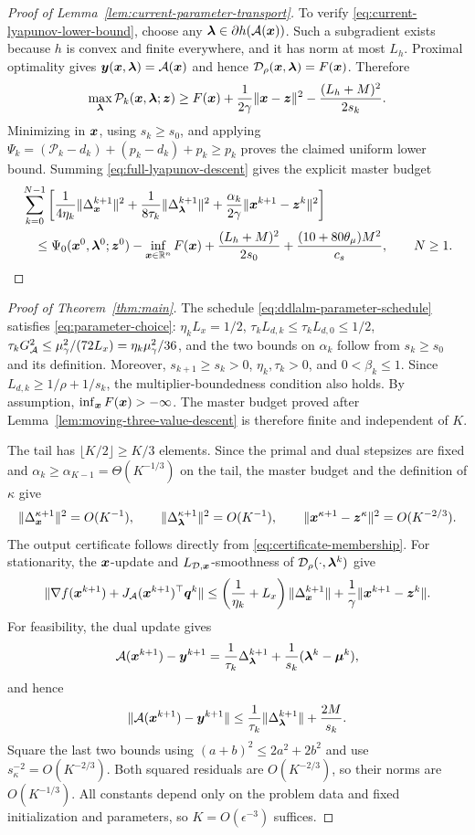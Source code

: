 \begin{proof}[Proof of Lemma~\ref{lem:current-parameter-transport}]
To verify \eqref{eq:current-lyapunov-lower-bound}, choose any
$\bm{\lambda}\in\partial h(\mathcal{A}(\bm{x}))$. Such a subgradient exists because
$h$ is convex and finite everywhere, and it has norm at most $L_h$.
Proximal optimality gives $\bm{y}(\bm{x},\bm{\lambda})=\mathcal{A}(\bm{x})$ and hence
$\mathcal D_\rho(\bm{x},\bm{\lambda})=F(\bm{x})$. Therefore
\[
\max_{\bm{\lambda}}\mathcal P_k(\bm{x},\bm{\lambda};\bm{z})
\ge F(\bm{x})+\frac1{2\gamma}\|\bm{x}-\bm{z}\|^2
-\frac{(L_h+M)^2}{2s_k}.
\]
Minimizing in $\bm{x}$, using $s_k\ge s_0$, and applying
$\Psi_k=(\mathcal P_k-d_k)+(p_k-d_k)+p_k\ge p_k$
proves the claimed uniform lower bound. Summing
\eqref{eq:full-lyapunov-descent} gives the explicit master budget
\[
\begin{aligned}
&\sum_{k=0}^{N-1}\left[
\frac1{4\eta_k}\|\Delta_{\bm{x}}^{k+1}\|^2
+\frac1{8\tau_k}\|\Delta_{\bm{\lambda}}^{k+1}\|^2
+\frac{\alpha_k}{2\gamma}\|\bm{x}^{k+1}-\bm{z}^k\|^2\right] \\
&\quad\le
\Psi_0(\bm{x}^0,\bm{\lambda}^0;\bm{z}^0)-\inf_{\bm{x}\in\mathbb{R}^n}F(\bm{x})
+\frac{(L_h+M)^2}{2s_0}
+\frac{(10+80\theta_\mu)M^2}{c_s},
\qquad N\ge1.
\end{aligned}
\]
\end{proof}
\fi


\begin{proof}[Proof of Theorem~\ref{thm:main}]
The schedule \eqref{eq:ddlalm-parameter-schedule} satisfies
\eqref{eq:parameter-choice}: $\eta_kL_x=1/2$,
$\tau_kL_{d,k}\le\tau_kL_{d,0}\le1/2$,
$\tau_kG_{\cal A}^2\le\mu_\gamma^2/(72L_x)
=\eta_k\mu_\gamma^2/36$, and the two bounds on $\alpha_k$ follow
from $s_k\ge s_0$ and its definition. Moreover,
$s_{k+1}\ge s_k>0$, $\eta_k,\tau_k>0$, and
$0<\beta_k\le1$. Since $L_{d,k}\ge1/\rho+1/s_k$,
the multiplier-boundedness condition also holds.
By assumption, $\inf_{\bm{x}}F(\bm{x})>-\infty$. The master budget proved after
Lemma~\ref{lem:moving-three-value-descent} is therefore finite and
independent of $K$.

The tail has $\lfloor K/2\rfloor\ge K/3$ elements. Since the primal
and dual stepsizes are fixed and
$\alpha_k\ge\alpha_{K-1}=\Theta(K^{-1/3})$ on the tail, the master
budget and the definition of $\kappa$ give
\[
\|\Delta_{\bm{x}}^{\kappa+1}\|^2=O(K^{-1}),\qquad
\|\Delta_{\bm{\lambda}}^{\kappa+1}\|^2=O(K^{-1}),\qquad
\|\bm{x}^{\kappa+1}-\bm{z}^\kappa\|^2=O(K^{-2/3}).
\]
The output certificate follows directly from
\eqref{eq:certificate-membership}. For stationarity, the $\bm{x}$-update
and $L_{\mathcal{D},\bm{x}}$-smoothness of $\mathcal D_\rho(\cdot,\bm{\lambda}^k)$ give
\[
\|\nabla f(\bm{x}^{k+1})+J_{\cal A}(\bm{x}^{k+1})^\top\bm{q}^k\|
\le\left(\frac1{\eta_k}+L_x\right)\|\Delta_{\bm{x}}^{k+1}\|
+\frac1\gamma\|\bm{x}^{k+1}-\bm{z}^k\|.
\]
For feasibility, the dual update gives
\[
{\cal A}(\bm{x}^{k+1})-\bm{y}^{k+1}
=\frac1{\tau_k}\Delta_{\bm{\lambda}}^{k+1}
+\frac1{s_k}(\bm{\lambda}^k-\bm{\mu}^k),
\]
and hence
\[
\|{\cal A}(\bm{x}^{k+1})-\bm{y}^{k+1}\|
\le\frac1{\tau_k}\|\Delta_{\bm{\lambda}}^{k+1}\|+\frac{2M}{s_k}.
\]
Square the last two bounds using $(a+b)^2\le2a^2+2b^2$ and use
$s_\kappa^{-2}=O(K^{-2/3})$. Both squared residuals are
$O(K^{-2/3})$, so their norms are $O(K^{-1/3})$. All constants depend
only on the problem data and fixed initialization and parameters, so
$K=O(\epsilon^{-3})$ suffices.
\end{proof}
